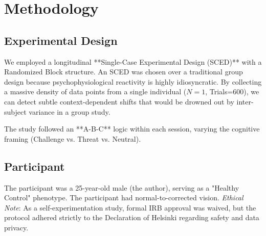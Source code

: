 \documentclass[journal]{IEEEtran}
\begin{document}
\section{Methodology}

\subsection{Experimental Design}
We employed a longitudinal **Single-Case Experimental Design (SCED)** with a Randomized Block structure. An SCED was chosen over a traditional group design because psychophysiological reactivity is highly idiosyncratic. By collecting a massive density of data points from a single individual ($N=1$, Trials=600), we can detect subtle context-dependent shifts that would be drowned out by inter-subject variance in a group study.

The study followed an **A-B-C** logic within each session, varying the cognitive framing (Challenge vs. Threat vs. Neutral).

\subsection{Participant}
The participant was a 25-year-old male (the author), serving as a "Healthy Control" phenotype. The participant had normal-to-corrected vision.
\textit{Ethical Note}: As a self-experimentation study, formal IRB approval was waived, but the protocol adhered strictly to the Declaration of Helsinki regarding safety and data privacy.
\end{document}
